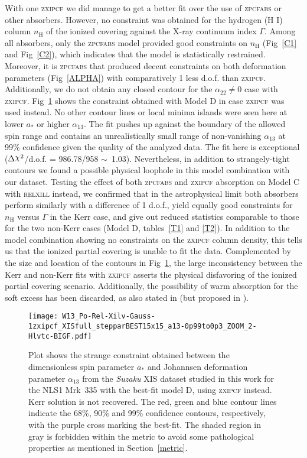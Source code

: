 \documentclass[aps,prd,twocolumn,superscriptaddress,nofootinbib,amsmath,amssymb]{revtex4-1}
\DeclareRobustCommand{\rchi}{{\mathpalette\irchi\relax}}
\newcommand{\irchi}[2]{\raisebox{\depth}{$#1\chi$}} %
\begin{document}
With one \textsc{zxipcf} we did manage to get a better fit over the use of \textsc{zpcfabs} or other absorbers. However, no constraint was obtained for the hydrogen (\textrm{H I}) column $n_{\textrm{H}}$ of the ionized covering against the X-ray continuum index $\Gamma$. Among all absorbers, only the \textsc{zpcfabs} model provided good constraints on $n_{\textrm{H}}$ (Fig~\ref{C1} and Fig~\ref{C2}), which indicates that the model is statistically restrained. Moreover, it is \textsc{zpcfabs} that produced decent constraints on both deformation parameters (Fig~\ref{ALPHA}) with comparatively 1 less d.o.f. than \textsc{zxipcf}. Additionally, we do not obtain any closed contour for the $\alpha_{22}\neq0$ case with \textsc{zxipcf}. Fig~\ref{zxipcf} shows the constraint obtained with Model D in case \textsc{zxipcf} was used instead. No other contour lines or local minima islands were seen here at lower $a_*$ or higher $\alpha_{13}$. The fit pushes up against the boundary of the allowed spin range and contains an unrealistically small range of non-vanishing $\alpha_{13}$ at 99\% confidence given the quality of the analyzed data. The fit here is exceptional  ($\Delta\rchi^2$/d.o.f. = 986.78/958 $\sim$~1.03). Nevertheless, in addition to strangely-tight contours we found a possible physical loophole in this model combination with our dataset. Testing the effect of both \textsc{zpcfabs} and \textsc{zxipcf} absorption on Model C with \textsc{relxill} instead, we confirmed that in the astrophysical limit both absorbers perform similarly with a difference of 1 d.o.f., yield equally good constraints for $n_{\textrm{H}}$ versus $\Gamma$ in the Kerr case, and give out reduced statistics comparable to those for the two non-Kerr cases (Model D, tables~\ref{T1} and \ref{T2}). In addition to the model combination showing no constraints on the \textsc{zxipcf} column density, this tells us that the ionized partial covering is unable to fit the data. Complemented by the size and location of the contours in Fig~\ref{zxipcf}, the large inconsistency between the Kerr and non-Kerr fits with \textsc{zxipcf} asserts the physical disfavoring of the ionized partial covering scenario. Additionally, the possibility of warm absorption for the soft excess has been discarded, as also stated in \cite{Larsson2008} (but proposed in \cite{Keek2016}). 

\begin{figure}[!t]
\centering
\texttt{[image: W13\_Po-Rel-Xilv-Gauss-1zxipcf\_XISfull\_stepparBEST15x15\_a13-0p99to0p3\_ZOOM\_2-Hlvtc-BIGF.pdf]}
\caption{Plot shows the strange constraint obtained between the dimensionless spin parameter $a_*$ and Johannsen deformation parameter $\alpha_{13}$ from the \textit{Suzaku} XIS dataset studied in this work for the NLS1 Mrk~335 with the best-fit model D, using \textsc{zxipcf} instead. Kerr solution is not recovered. The red, green and blue contour lines indicate the 68\%, 90\% and 99\% confidence contours, respectively, with the purple cross marking the best-fit. The shaded region in gray is forbidden within the metric to avoid some pathological properties as mentioned in Section~\ref{metric}.} \label{zxipcf}
\end{figure}
\end{document}
